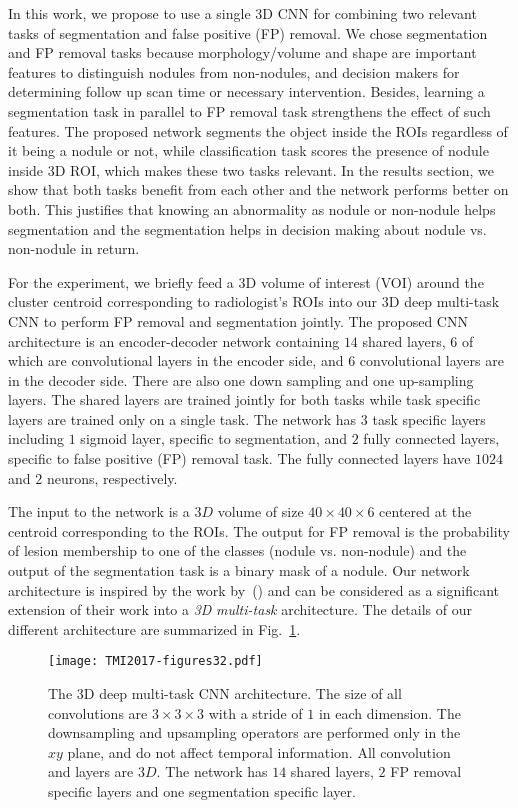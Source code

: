\documentclass[preprint,12pt]{elsarticle}
\begin{document}
In this work, we propose to use a single 3D CNN for combining two relevant tasks of segmentation and false positive (FP) removal. We chose segmentation and FP removal tasks because morphology/volume and shape are important features to distinguish nodules from non-nodules, and decision makers for determining follow up scan time or necessary intervention. Besides, learning a segmentation task in parallel to FP removal task strengthens the effect of such features. The proposed network segments the object inside the ROIs regardless of it being a nodule or not, while classification task scores the presence of nodule inside 3D ROI, which makes these two tasks relevant. In the results section, we show that both tasks benefit from each other and the network performs better on both. This justifies that knowing an abnormality as nodule or non-nodule helps segmentation and the segmentation helps in decision making about nodule vs. non-nodule in return.


For the experiment, we briefly feed a 3D volume of interest (VOI) around the cluster centroid corresponding to radiologist’s ROIs into our 3D deep multi-task CNN to perform FP removal and segmentation jointly. The proposed CNN architecture is an encoder-decoder network containing $14$ shared layers, $6$ of which are convolutional layers in the encoder side, and $6$ convolutional layers are in the decoder side. There are also one down sampling and one up-sampling layers. The shared layers are trained jointly for both tasks while task specific layers are trained only on a single task. The network has $3$ task specific layers including $1$ sigmoid layer, specific to segmentation, and $2$ fully connected layers, specific to false positive (FP) removal task. The fully connected layers have $1024$ and $2$ neurons, respectively.


The input to the network is a $3D$ volume of size $40\times 40\times 6$ centered at the centroid corresponding to the ROIs. The output for FP removal is the probability of lesion membership to one of the classes (nodule vs. non-nodule) and the output of the segmentation task is a binary mask of a nodule. Our network architecture is inspired by the work by~(\cite{badrinarayanan2017segnet}) and can be considered as a significant extension of their work into a \textit{3D} \textit{multi-task} architecture. The details of our different architecture are summarized in Fig.~\ref{fig:architecture}.


\begin{figure}[h]
\centering
\texttt{[image: TMI2017-figures32.pdf]}
\caption{The 3D deep multi-task CNN architecture. The size of all convolutions are $3\times 3\times 3$ with a stride of $1$ in each dimension. The downsampling and upsampling operators are performed only in the $xy$ plane, and do not affect temporal information. All convolution and layers are $3D$. The network has $14$ shared layers, $2$ FP removal specific layers and one segmentation specific layer. \label{fig:architecture}}
\end{figure}
\end{document}
